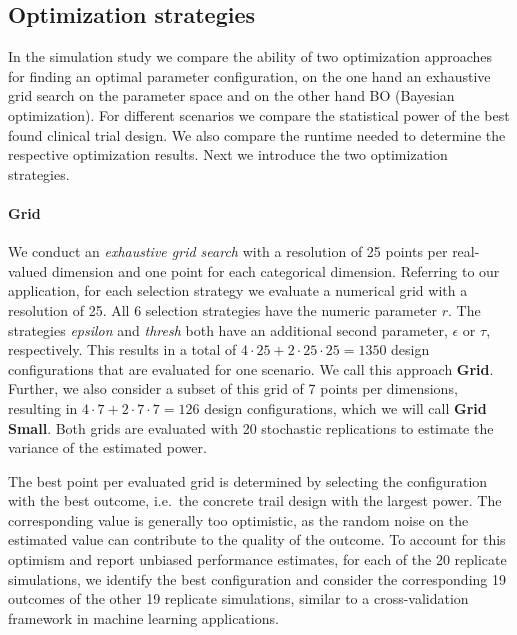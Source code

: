 \documentclass[bimj,fleqn]{w-art}
\theoremstyle{plain}
\theoremstyle{definition}
\begin{document}
\subsection{Optimization strategies}

In the simulation study we compare the ability of two optimization approaches for finding an optimal parameter configuration, on the one hand an exhaustive grid search on the parameter space and on the other hand BO (Bayesian optimization).
For different scenarios we compare the statistical power of the best found clinical trial design.
We also compare the runtime needed to determine the respective optimization results.
Next we introduce the two optimization strategies.

\paragraph{Grid}
We conduct an \emph{exhaustive grid search} with a resolution of 25 points per real-valued dimension and one point for each categorical dimension.
Referring to our application, for each selection strategy we evaluate a numerical grid with a resolution of 25.
All 6 selection strategies have the numeric parameter $r$.
The strategies \emph{epsilon} and \emph{thresh} both have an additional second parameter, $\epsilon$ or $\tau$, respectively. 
This results in a total of $4 \cdot 25 + 2 \cdot 25 \cdot 25 = 1350$ design configurations that are evaluated for one scenario.
We call this approach \textbf{Grid}.
Further, we also consider a subset of this grid of 7 points per dimensions, resulting in $4 \cdot 7 + 2 \cdot 7 \cdot 7 = 126$ design configurations, which we will call \textbf{Grid Small}.
Both grids are evaluated with 20 stochastic replications to estimate the variance of the estimated power.

The best point per evaluated grid is determined by selecting the configuration with the best outcome, i.e.\  the concrete trail design with the largest power.
The corresponding value is generally too optimistic, as the random noise on the estimated value can contribute to the quality of the outcome.
To account for this optimism and report unbiased performance estimates, for each of the 20 replicate simulations, we identify the best configuration and consider the corresponding 19 outcomes of the other 19 replicate simulations, similar to a cross-validation framework in machine learning applications. 
\end{document}
